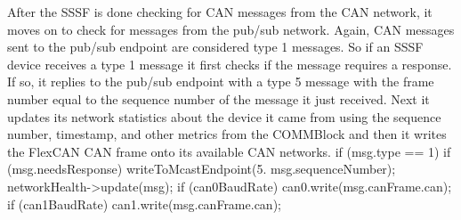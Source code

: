 \documentclass[letterpaper,twocolumn,10pt]{article}
\begin{document}
After the SSSF is done checking for CAN messages from the CAN network, it moves on to check for messages from the pub/sub network. Again, CAN messages sent to the pub/sub endpoint are considered type 1 messages. So if an SSSF device receives a type 1 message it first checks if the message requires a response. If so, it replies to the pub/sub endpoint with a type 5 message with the frame number equal to the sequence number of the message it just received. Next it updates its network statistics about the device it came from using the sequence number, timestamp, and other metrics from the COMMBlock and then it writes the FlexCAN CAN frame onto its available CAN networks.
    if (msg.type == 1)
    {
        if (msg.needsResponse)
        {
            writeToMcastEndpoint(5. msg.sequenceNumber);
        }
        networkHealth->update(msg);
        if (can0BaudRate) can0.write(msg.canFrame.can);
        if (can1BaudRate) can1.write(msg.canFrame.can);
    }
\end{document}
